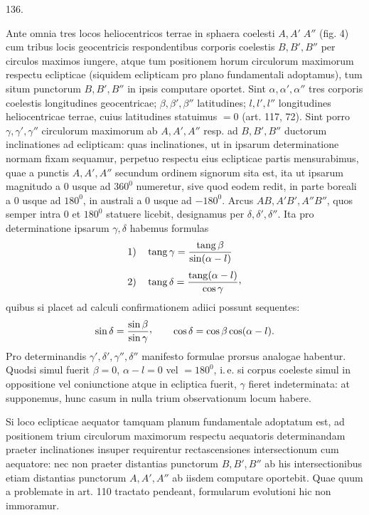 \par{}\medskip
\begin{center}\hypertarget{native-182-article136}{}136.\end{center}
Ante omnia tres locos heliocentricos terrae in sphaera coelesti $A,A'\;A''$
(fig. 4) cum tribus locis geocentricis respondentibus corporis coelestis $B,B',B''$
per circulos maximos iungere, atque tum positionem horum circulorum maximorum
respectu eclipticae (siquidem eclipticam pro plano fundamentali adoptamus),
tum situm punctorum $B,B',B''$ in ipsis computare oportet. Sint $\alpha,\alpha',\alpha''$
tres corporis coelestis longitudines geocentricae; $\beta,\beta',\beta''$ latitudines; $l,l',l''$
longitudines heliocentricae terrae, cuius latitudines statuimus $=0$ (art. 117, 72).
Sint porro $\gamma,\gamma',\gamma''$ circulorum maximorum ab $A,A',A''$ resp. ad $B,B',B''$ ductorum
inclinationes ad eclipticam: quas inclinationes, ut in ipsarum determinatione
normam fixam sequamur, perpetuo respectu eius eclipticae partis mensurabimus,
quae a punctis $A,A',A''$ secundum ordinem signorum sita est, ita
ut ipsarum magnitudo a $0$ usque ad $360^0$ numeretur, sive quod eodem redit,
in parte boreali a $0$ usque ad $180^0$, in australi a $0$ usque ad $-180^0$. Arcus
$AB,A'B',A''B''$, quos semper intra $0$ et $180^0$ statuere licebit, designamus per
$\delta,\delta',\delta''$. Ita pro determinatione ipsarum $\gamma,\delta$ habemus formulas
\[
\begin{aligned}
1)\quad&\operatorname{tang}\gamma=\frac{\operatorname{tang}\beta}{\sin(\alpha-l)}\\[.7ex]
2)\quad&\operatorname{tang}\delta=\frac{\operatorname{tang}(\alpha-l)}{\cos\gamma}\mathpunct{\raisebox{.45ex}{,}}
\end{aligned}
\]
quibus si placet ad calculi confirmationem adiici possunt sequentes:
\[
\sin\delta=\frac{\sin\beta}{\sin\gamma}\mathpunct{\raisebox{.45ex}{,}}\qquad
\cos\delta=\cos\beta\cos(\alpha-l).
\]
Pro determinandis $\gamma',\delta',\gamma'',\delta''$ manifesto formulae prorsus analogae habentur.
Quodsi simul fuerit $\beta=0$, $\alpha-l=0$ vel $=180^0$, i.\,e. si corpus coeleste simul
in oppositione vel coniunctione atque in ecliptica fuerit, $\gamma$ fieret indeterminata:
at supponemus, hunc casum in nulla trium observationum locum habere.

Si loco eclipticae aequator tamquam planum fundamentale adoptatum est,
ad positionem trium circulorum maximorum respectu aequatoris determinandam
praeter inclinationes insuper requirentur rectascensiones intersectionum cum
\hypertarget{native-183}{}aequatore: nec non praeter distantias punctorum $B,B',B''$ ab his intersectionibus
etiam distantias punctorum $A,A',A''$ ab iisdem computare oportebit.
Quae quum a problemate in art. 110 tractato pendeant, formularum evolutioni
hic non immoramur.
